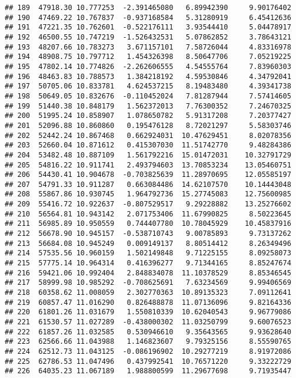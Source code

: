 \documentclass[
]{article}
\begin{document}
\begin{verbatim}
## 189  47918.30 10.777253  -2.391465080   6.89942390     9.90176402
## 190  47469.22 10.767837  -0.937168584   5.31280919     6.45412636
## 191  47221.35 10.762601  -0.522176111   3.93544410     5.04478917
## 192  46500.55 10.747219  -1.526432531   5.07862852     3.78643121
## 193  48207.66 10.783273   3.671157101   7.58726044     4.83316978
## 194  48908.75 10.797712   1.454326398   8.50647706     7.05219225
## 195  47802.14 10.774826  -2.262606555   4.54555764     7.83960303
## 196  48463.83 10.788573   1.384218192   4.59530846     4.34792041
## 197  50705.06 10.833781   4.624537215   8.19483480     4.39341738
## 198  50649.05 10.832676  -0.110452024   7.81287944     7.57414605
## 199  51440.38 10.848179   1.562372013   7.76300352     7.24670325
## 200  51995.24 10.858907   1.078650782   5.91317208     7.20377427
## 201  52096.88 10.860860   0.195476128   8.72021297     5.58303746
## 202  52442.24 10.867468   0.662924031  10.47629451     8.02078356
## 203  52660.04 10.871612   0.415307030  11.51742770     9.48284386
## 204  53482.48 10.887109   1.561792216  15.01472031    10.32791729
## 205  54816.22 10.911741   2.493794603  13.70853234    13.05460751
## 206  54430.41 10.904678  -0.703825639  11.28970695    12.05585197
## 207  54791.33 10.911287   0.663084486  14.62107570    10.14443048
## 208  55867.86 10.930745   1.964792736  15.27745083    12.75600985
## 209  55416.72 10.922637  -0.807529517   9.29228882    13.25276602
## 210  56564.81 10.943142   2.071753406  11.67990825     8.50223645
## 211  56985.89 10.950559   0.744407780  10.78045929    10.45837916
## 212  56678.90 10.945157  -0.538710743   9.00785893     9.73137262
## 213  56684.08 10.945249   0.009149137   8.80514412     8.26349496
## 214  57535.56 10.960159   1.502149848   9.71225155     8.09258073
## 215  57775.14 10.964314   0.416396277   9.71344165     8.85247674
## 216  59421.06 10.992404   2.848834078  11.10378529     8.85346545
## 217  58999.98 10.985292  -0.708625691   7.63234569     9.99406569
## 218  60358.62 11.008059   2.302770363  10.89135323     7.09112641
## 219  60857.47 11.016290   0.826488878  11.07136096     9.82164336
## 220  61801.26 11.031679   1.550810339  10.62040543     9.96779086
## 221  61530.57 11.027289  -0.438000302  11.03250799     9.60076523
## 222  61857.26 11.032585   0.530946610   9.35643565     9.93628640
## 223  62566.66 11.043988   1.146823607   9.79325156     8.55590765
## 224  62512.73 11.043125  -0.086196902  10.29277219     8.91972086
## 225  62786.53 11.047496   0.437992541  10.76571220     9.33222729
## 226  64035.23 11.067189   1.988800599  11.29677698     9.71935447

\end{verbatim}
\end{document}

